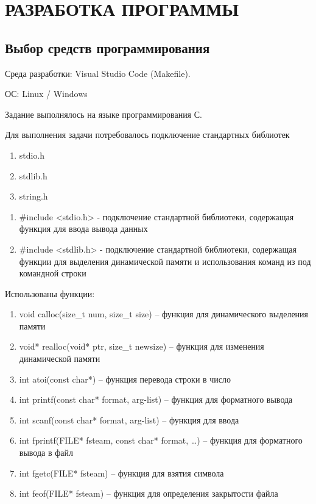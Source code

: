 \newpage

\section{РАЗРАБОТКА ПРОГРАММЫ}

\subsection{Выбор средств программирования}

Среда разработки: Visual Studio Code (Makefile).

ОС: Linux / Windows

Задание выполнялось на языке программирования С.

Для выполнения задачи потребовалось подключение стандартных библиотек 

\begin{enumerate}
    \item stdio.h
    \item stdlib.h
    \item string.h
\end{enumerate}

\begin{enumerate}
    \item \#include <stdio.h> - подключение стандартной библиотеки, содержащая функция для ввода вывода данных
    \item \#include <stdlib.h> -  подключение стандартной библиотеки, содержащая функции для выделения динамической памяти и использования команд из под командной строки
\end{enumerate}

Использованы функции: 

\begin{enumerate}
    \item void calloc(size\_t num, size\_t size) – функция для динамического выделения памяти

    \item void* realloc(void* ptr, size\_t newsize) – функция для изменения динамической памяти

    \item int atoi(const char*) – функция перевода строки в число

    \item int printf(const char* format, arg-list) – функция для форматного вывода

    \item int scanf(const char* format, arg-list) – функция для ввода

    \item int fprintf(FILE* fsteam, const char* format, …) – функция для форматного вывода в файл

    \item int fgetc(FILE* fsteam) – функция для взятия символа

    \item int feof(FILE* fsteam) – функция для определения закрытости файла
\end{enumerate}



